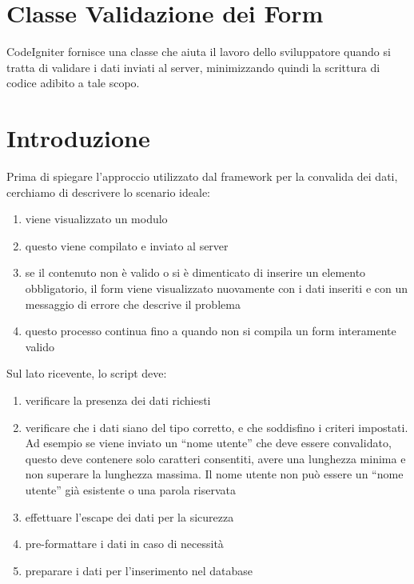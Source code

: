 \section{Classe Validazione dei Form}
\label{class:formvalidation}

CodeIgniter fornisce una classe che aiuta il lavoro dello sviluppatore quando si tratta di validare i dati inviati al server, minimizzando quindi la scrittura di codice adibito a tale scopo.

\section*{Introduzione}
Prima di spiegare l'approccio utilizzato dal framework per la convalida dei dati, cerchiamo di descrivere lo scenario ideale:

\begin{enumerate}
\item viene visualizzato un modulo
\item questo viene compilato e inviato al server
\item se il contenuto non è valido o si è dimenticato di inserire un elemento obbligatorio, il form viene visualizzato nuovamente con i dati inseriti e con un messaggio di errore che descrive il problema
\item questo processo continua fino a quando non si compila un form interamente valido
\end{enumerate}

Sul lato ricevente, lo script deve:

\begin{enumerate}
\item verificare la presenza dei dati richiesti
\item verificare che i dati siano del tipo corretto, e che soddisfino i criteri impostati. Ad esempio se viene inviato un ``nome utente'' che deve essere convalidato, questo deve contenere solo caratteri consentiti, avere una lunghezza minima e non superare la lunghezza massima. Il nome utente non può essere un ``nome utente'' già esistente o una parola riservata
\item effettuare l'escape dei dati per la sicurezza
\item pre-formattare i dati in caso di necessità
\item preparare i dati per l'inserimento nel database
\end{enumerate}

